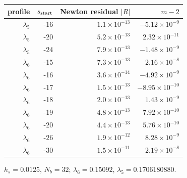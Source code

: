 \begin{tabular}{rrrr}
\toprule
profile & $s_{\rm start}$ & Newton residual $|R|$ & $m-2$\\
\midrule
$\lambda_5$ & -16 & $1.1\times10^{-13}$ & $-5.12\times10^{-9}$\\
$\lambda_5$ & -20 & $5.2\times10^{-13}$ & $2.32\times10^{-11}$\\
$\lambda_5$ & -24 & $7.9\times10^{-13}$ & $-1.48\times10^{-9}$\\
$\lambda_6$ & -15 & $7.3\times10^{-13}$ & $2.16\times10^{-8}$\\
$\lambda_6$ & -16 & $3.6\times10^{-14}$ & $-4.92\times10^{-9}$\\
$\lambda_6$ & -17 & $1.5\times10^{-13}$ & $-8.95\times10^{-10}$\\
$\lambda_6$ & -18 & $2.0\times10^{-13}$ & $1.43\times10^{-9}$\\
$\lambda_6$ & -19 & $4.8\times10^{-13}$ & $7.92\times10^{-10}$\\
$\lambda_6$ & -20 & $4.4\times10^{-13}$ & $5.76\times10^{-10}$\\
$\lambda_6$ & -26 & $1.9\times10^{-12}$ & $8.28\times10^{-9}$\\
$\lambda_6$ & -30 & $1.5\times10^{-11}$ & $2.19\times10^{-8}$\\
\bottomrule
\end{tabular}

\smallskip\par\footnotesize $h_s=0.0125$, $N_b=32$; $\lambda_6=0.15092$, $\lambda_5=0.1706180880$.
